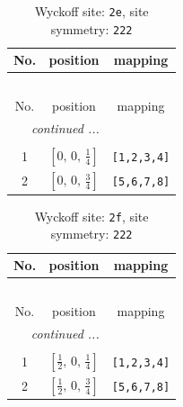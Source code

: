 \documentclass[fleqn,8pt]{jsarticle}
\begin{document}
\begin{longtable}{ccc}
\caption{Wyckoff site: {\tt 2e}, site symmetry: {\tt 222}}
 \\
 \hline \hline
No. & position & mapping \\ \hline \endfirsthead

\multicolumn{2}{l}{\tablename\ \thetable{}} \\
 \hline \hline
No. & position & mapping \\ \hline \endhead

 \hline \hline
\multicolumn{2}{r}{\footnotesize\it continued ...} \\ \endfoot

 \hline \hline
\multicolumn{2}{r}{} \\ \endlastfoot

1 & $\left[ 0,\, 0,\, \frac{1}{4} \right]$ & {\tt [1,2,3,4]} \\ \hline
2 & $\left[ 0,\, 0,\, \frac{3}{4} \right]$ & {\tt [5,6,7,8]} \\
\end{longtable}
\renewcommand{\arraystretch}{1.2}
\begin{longtable}{ccc}
\caption{Wyckoff site: {\tt 2f}, site symmetry: {\tt 222}}
 \\
 \hline \hline
No. & position & mapping \\ \hline \endfirsthead

\multicolumn{2}{l}{\tablename\ \thetable{}} \\
 \hline \hline
No. & position & mapping \\ \hline \endhead

 \hline \hline
\multicolumn{2}{r}{\footnotesize\it continued ...} \\ \endfoot

 \hline \hline
\multicolumn{2}{r}{} \\ \endlastfoot

1 & $\left[ \frac{1}{2},\, 0,\, \frac{1}{4} \right]$ & {\tt [1,2,3,4]} \\ \hline
2 & $\left[ \frac{1}{2},\, 0,\, \frac{3}{4} \right]$ & {\tt [5,6,7,8]} \\
\end{longtable}
\renewcommand{\arraystretch}{1.2}
\end{document}

